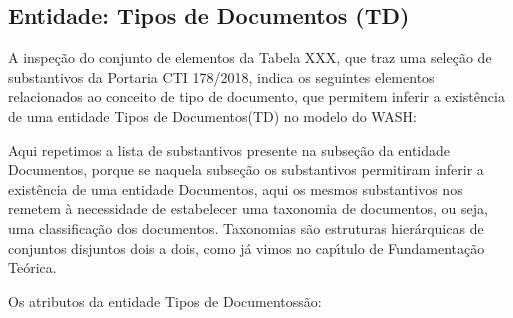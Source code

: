 \documentclass[
12pt,		%
openright,	%
twoside,  %
a4paper,			%
chapter=TITLE,		%
english,			%
french,				%
spanish,			%
brazil				%
]{USPSC-classe/USPSC}
\begin{document}
\subsection[Entidade: Tipos de Documentos (TD)]{Entidade: Tipos de Documentos (TD)}\label{Entidade: Tipos de Documentos (TD)}
A inspe\c{c}\~ao do conjunto de elementos da Tabela XXX, que traz uma sele\c{c}\~ao de substantivos da Portaria CTI 178/2018, indica os seguintes elementos relacionados ao conceito de \textquotedbl tipo de documento\textquotedbl , que permitem inferir a exist\^encia de uma entidade \textquotedbl Tipos de Documentos\textquotedbl  (TD) no modelo do WASH:










\noindent\begin{center}\mbox{\centering{}}\end{center}


Aqui repetimos a lista de substantivos presente na subse\c{c}\~ao da entidade \textquotedbl Documentos\textquotedbl , porque se naquela subse\c{c}\~ao os substantivos permitiram inferir a exist\^encia de uma entidade \textquotedbl Documentos\textquotedbl , aqui os mesmos substantivos nos remetem \`a necessidade de estabelecer uma taxonomia de documentos, ou seja, uma classifica\c{c}\~ao dos documentos. Taxonomias s\~ao estruturas hier\'arquicas de conjuntos disjuntos dois a dois, como j\'a vimos no cap\'{\i}tulo de Fundamenta\c{c}\~ao Te\'orica.









Os atributos da entidade \textquotedbl Tipos de Documentos\textquotedbl  s\~ao:
\end{document}
